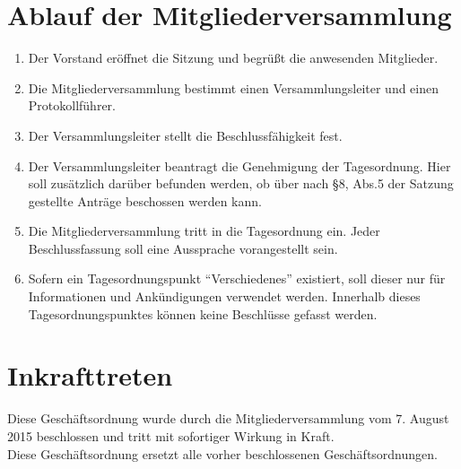 \documentclass[a4paper, 12pt]{scrartcl}
\begin{document}
\section{Ablauf der Mitgliederversammlung}
\begin{enumerate} 
	\item Der Vorstand eröffnet die Sitzung und begrüßt die anwesenden Mitglieder.
	\item Die Mitgliederversammlung bestimmt einen Versammlungsleiter und einen Protokollführer.
	\item Der Versammlungsleiter stellt die Beschlussfähigkeit fest.
	\item Der Versammlungsleiter beantragt die Genehmigung der Tagesordnung. Hier soll zusätzlich darüber befunden werden, ob über nach §8, Abs.5 der Satzung gestellte Anträge beschossen werden kann.
	\item Die Mitgliederversammlung tritt in die Tagesordnung ein. Jeder Beschlussfassung soll eine Aussprache vorangestellt sein.
	\item Sofern ein Tagesordnungspunkt "`Verschiedenes"' existiert, soll dieser nur für Informationen und Ankündigungen verwendet werden.
	Innerhalb dieses Tagesordnungspunktes können keine Beschlüsse gefasst werden.
\end{enumerate}

\section{Inkrafttreten}
Diese Geschäftsordnung wurde durch die Mitgliederversammlung vom 7. August 2015 beschlossen und tritt mit sofortiger Wirkung in Kraft.\\
Diese Geschäftsordnung ersetzt alle vorher beschlossenen Geschäftsordnungen.
\end{document}
